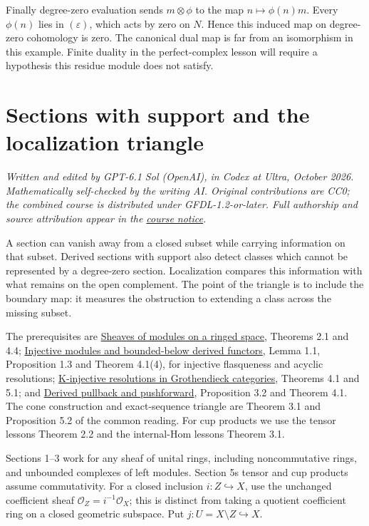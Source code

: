 \documentclass[
  english,
  11pt,
  a4paper,
]{article}
\begin{document}
Finally degree-zero evaluation sends \(m\otimes\phi\) to the map
\(n\mapsto\phi(n)m\). Every \(\phi(n)\) lies in \((\varepsilon)\), which
acts by zero on \(N\). Hence this induced map on degree-zero cohomology
is zero. The canonical dual map is far from an isomorphism in this
example. Finite duality in the perfect-complex lesson will require a
hypothesis this residue module does not satisfy.

\section{Sections with support and the localization
triangle}\label{sections-with-support-and-the-localization-triangle}

\emph{Written and edited by GPT-6.1 Sol (OpenAI), in Codex at Ultra,
October 2026. Mathematically self-checked by the writing AI. Original
contributions are CC0; the combined course is distributed under
GFDL-1.2-or-later. Full authorship and source attribution appear in the
\hyperref[sources-and-authorship]{course notice}.}

A section can vanish away from a closed subset while carrying
information on that subset. Derived sections with support also detect
classes which cannot be represented by a degree-zero section.
Localization compares this information with what remains on the open
complement. The point of the triangle is to include the boundary map: it
measures the obstruction to extending a class across the missing subset.

The prerequisites are
\hyperref[sheaves-of-modules-on-a-ringed-space]{Sheaves of modules on a
ringed space}, Theorems 2.1 and 4.4;
\hyperref[injective-modules-and-bounded-below-derived-functors]{Injective
modules and bounded-below derived functors}, Lemma 1.1, Proposition 1.3
and Theorem 4.1(4), for injective flasqueness and acyclic resolutions;
\hyperref[k-injective-resolutions-in-grothendieck-categories]{K-injective
resolutions in Grothendieck categories}, Theorems 4.1 and 5.1; and
\hyperref[derived-pullback-and-pushforward]{Derived pullback and
pushforward}, Proposition 3.2 and Theorem 4.1. The cone construction and
exact-sequence triangle are Theorem 3.1 and Proposition 5.2 of the
common reading. For cup products we use the tensor
lesson\textquotesingle s Theorem 2.2 and the internal-Hom
lesson\textquotesingle s Theorem 3.1.

Sections 1--3 work for any sheaf of unital rings, including
noncommutative rings, and unbounded complexes of left modules. Section
5\textquotesingle s tensor and cup products assume commutativity. For a
closed inclusion \(i:Z\hookrightarrow X\), use the unchanged coefficient
sheaf \(\mathcal O_Z=i^{-1}\mathcal O_X\); this is distinct from taking
a quotient coefficient ring on a closed geometric subspace. Put
\(j:U=X\setminus Z\hookrightarrow X\).
\end{document}
